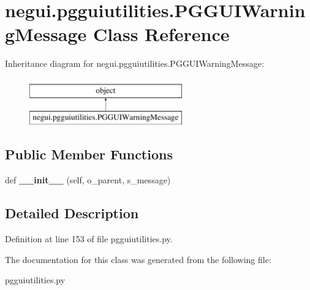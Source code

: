 \hypertarget{classnegui_1_1pgguiutilities_1_1PGGUIWarningMessage}{}\section{negui.\+pgguiutilities.\+P\+G\+G\+U\+I\+Warning\+Message Class Reference}
\label{classnegui_1_1pgguiutilities_1_1PGGUIWarningMessage}
Inheritance diagram for negui.\+pgguiutilities.\+P\+G\+G\+U\+I\+Warning\+Message\+:\begin{figure}[H]
\begin{center}
\leavevmode
\includegraphics[height=2.000000cm]{classnegui_1_1pgguiutilities_1_1PGGUIWarningMessage}
\end{center}
\end{figure}
\subsection*{Public Member Functions}
\begin{DoxyCompactItemize}
\item 
def {\bfseries \+\_\+\+\_\+init\+\_\+\+\_\+} (self, o\+\_\+parent, s\+\_\+message)\hypertarget{classnegui_1_1pgguiutilities_1_1PGGUIWarningMessage_a0ac338d8bcaa1e19be56a0b71a222d6e}{}\label{classnegui_1_1pgguiutilities_1_1PGGUIWarningMessage_a0ac338d8bcaa1e19be56a0b71a222d6e}

\end{DoxyCompactItemize}


\subsection{Detailed Description}


Definition at line 153 of file pgguiutilities.\+py.



The documentation for this class was generated from the following file\+:\begin{DoxyCompactItemize}
\item 
pgguiutilities.\+py\end{DoxyCompactItemize}
